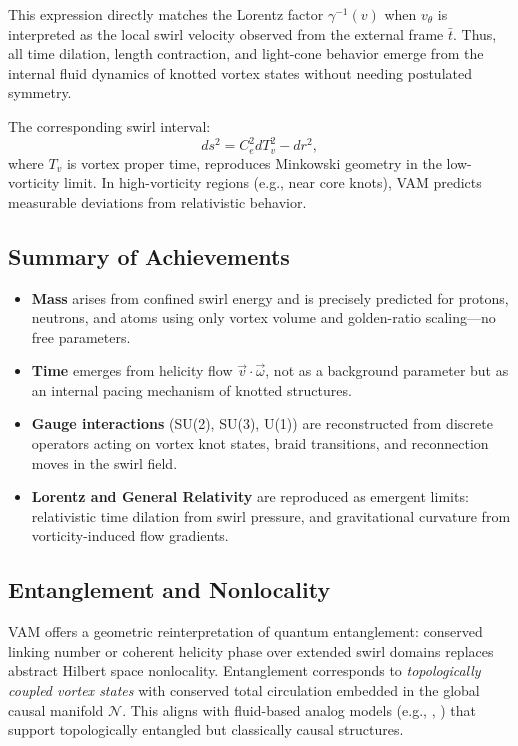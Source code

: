 \documentclass[12pt]{article}
\begin{document}
This expression directly matches the Lorentz factor \( \gamma^{-1}(v) \) when \( v_\theta \) is interpreted as the local swirl velocity observed from the external frame \( \bar{t} \). Thus, all time dilation, length contraction, and light-cone behavior emerge from the internal fluid dynamics of knotted vortex states without needing postulated symmetry.

The corresponding swirl interval:
\[
ds^2 = C_e^2 dT_v^2 - dr^2,
\]
where \( T_v \) is vortex proper time, reproduces Minkowski geometry in the low-vorticity limit. In high-vorticity regions (e.g., near core knots), VAM predicts measurable deviations from relativistic behavior.

\subsection*{Summary of Achievements}

\begin{itemize}
  \item \textbf{Mass} arises from confined swirl energy and is precisely predicted for protons, neutrons, and atoms using only vortex volume and golden-ratio scaling—no free parameters.
  \item \textbf{Time} emerges from helicity flow \( \vec{v} \cdot \vec{\omega} \), not as a background parameter but as an internal pacing mechanism of knotted structures.
  \item \textbf{Gauge interactions} (SU(2), SU(3), U(1)) are reconstructed from discrete operators acting on vortex knot states, braid transitions, and reconnection moves in the swirl field.
  \item \textbf{Lorentz and General Relativity} are reproduced as emergent limits: relativistic time dilation from swirl pressure, and gravitational curvature from vorticity-induced flow gradients.
\end{itemize}

\subsection*{Entanglement and Nonlocality}

VAM offers a geometric reinterpretation of quantum entanglement: conserved linking number or coherent helicity phase over extended swirl domains replaces abstract Hilbert space nonlocality. Entanglement corresponds to \emph{topologically coupled vortex states} with conserved total circulation embedded in the global causal manifold \( \mathcal{N} \). This aligns with fluid-based analog models (e.g., \cite{volovik2003universe}, \cite{kiehn2005topological}) that support topologically entangled but classically causal structures.
\end{document}
